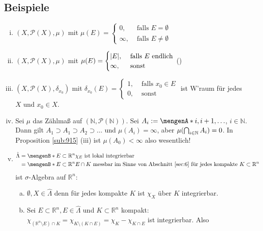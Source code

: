 \subsection[Beispiele für Maßräume]{Beispiele} %
\label{sub:916}
\begin{enumerate}[(i)]
	\item $(X, \mathcal{P}(X),  \mu)$ mit $\mu(E) = \begin{cases}
			0, &\text{ falls }E = \emptyset\\
			\infty, &\text{ falls } E \not= \emptyset
		\end{cases}$
	\item $(X, \mathcal{P}(X),  \mu)$ mit $\mu(E) = \begin{cases}
			\lvert E\rvert , &\text{ falls }E \text{ endlich}\\
			\infty, &\text{ sonst } 
		\end{cases} $ \hfill ()
	\item $(X, \mathcal{P}(X), \delta_{x_0})$ mit $\delta_{x_0}(E) = \begin{cases}
		1, &\text{ falls }x_0 \in E\\
		0 , &\text{ sonst}
	\end{cases}$ ist W'raum für jedes $X$ und $x_0 \in X$.
	\item Sei $\mu$ das Zählmaß auf $(\mathds{N}, \mathcal{P}(\mathds{N}))$. Sei $A_i := \set{i, i+1, \ldots } $, $i \in \mathds{N}$. Dann gilt 
	$A_1 \supset A_1 \supset A_2 \supset \ldots $ und $\mu (A_i) = \infty$, aber $\mu (\bigcap_{i \in \mathbb{N}} A_i) = 0$. In Proposition \ref{sub:915} (iii) ist
	$\mu(A_0)< \infty$ also wesentlich!
	\item \begin{align*}
		\hat \Lambda &= \set[E \subset \mathds{R}^n]{\chi_E \text{ ist lokal integrierbar}} \\
		&= \set[E \subset \mathds{R}^n]{E \cap K \text{ messbar im Sinne von Abschnitt \ref{sec:6} für jedes kompakte }K  \subset \mathds{R}^n} 
	\end{align*}
	ist $\sigma$-Algebra auf $\mathds{R}^n$:
	\begin{enumerate}[a)]
		\item $\emptyset, X \in \hat \Lambda$ denn für jedes kompakte $K$ ist $\chi_X$ über $K$ integrierbar.
		\item Sei $E \subset \mathds{R}^n, E \in \hat \Lambda$ und $K \subset \mathds{R}^n$ kompakt: 
		$\chi_{(\mathds{R}^n \setminus E) \cap K} = \chi_{K \setminus (K \cap E)} = \chi_{K} - \chi_{K \cap E}$ ist integrierbar. Also 

\end{enumerate}
\end{enumerate}
